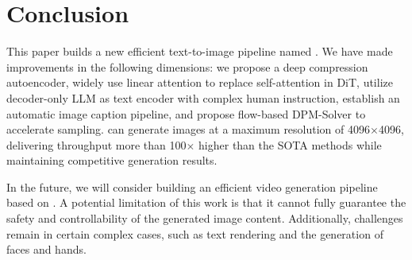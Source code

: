 \section{Conclusion}

This paper builds a new efficient text-to-image pipeline named \model. We have made improvements in the following dimensions: we propose a deep compression autoencoder, widely use linear attention to replace self-attention in DiT, utilize decoder-only LLM as text encoder with complex human instruction, establish an automatic image caption pipeline, and propose flow-based DPM-Solver to accelerate sampling. \model can generate images at a maximum resolution of 4096$\times$4096, delivering throughput more than 100$\times$ higher than the SOTA methods while maintaining competitive generation results.

In the future, we will consider building an efficient video generation pipeline based on \model. A potential limitation of this work is that it cannot fully guarantee the safety and controllability of the generated image content. Additionally, challenges remain in certain complex cases, such as text rendering and the generation of faces and hands.
